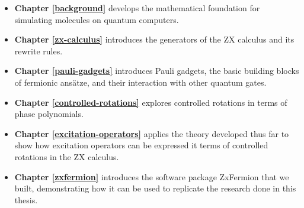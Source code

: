 \begin{itemize}
    \item \textbf{Chapter \ref{background}} develops the mathematical foundation for simulating molecules on quantum computers.
    \item \textbf{Chapter \ref{zx-calculus}} introduces the generators of the ZX calculus and its rewrite rules.
    \item \textbf{Chapter \ref{pauli-gadgets}} introduces Pauli gadgets, the basic building blocks of fermionic ansätze, and their interaction with other quantum gates.
    \item \textbf{Chapter \ref{controlled-rotations}} explores controlled rotations in terms of phase polynomials.
    \item \textbf{Chapter \ref{excitation-operators}} applies the theory developed thus far to show how excitation operators can be expressed it terms of controlled rotations in the ZX calculus.
    \item \textbf{Chapter \ref{zxfermion}} introduces the software package ZxFermion that we built, demonstrating how it can be used to replicate the research done in this thesis.
\end{itemize}
